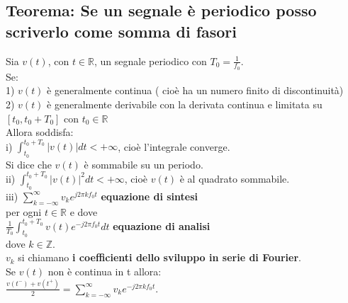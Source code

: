 	\subsection{Teorema: Se un segnale è periodico posso scriverlo come somma di fasori}
	Sia $ v(t) $, con $t \in \mathbb{R} $, un segnale periodico con $T_0=\frac{1}{f_0} $.\\
	Se:\\
	1) $ v(t) $ è generalmente continua ( cioè ha un numero finito di discontinuità)\\
	2) $ v(t) $ è generalmente derivabile con la derivata continua e limitata su $ [t_0,t_0+T_0] $ con $ t_0 \in \mathbb{R}$\\
	Allora soddisfa:\\
	i) $ \int_{t_0}^{ t_0+T_0} |v(t)| dt < +\infty $, cioè l'integrale converge.\\
	Si dice che $ v(t) $ è sommabile su un periodo.\\
	ii) $ \int_{t_0}^{ t_0+T_0} |v(t)|^2 dt < +\infty $, cioè $ v(t) $ è al quadrato sommabile.\\
	iii) $ \sum_{k= -\infty}^{\infty} v_k e^{j 2 \pi k f_0 t} $ \textbf{ equazione di sintesi}\\
	per ogni $t \in \mathbb{R} $ e dove\\
	$ \frac{1}{T_0}\int_{t_0}^{ t_0+T_0} v(t) e^{-j 2 \pi f_0 t} dt $ \textbf{ equazione di analisi}\\
	dove $ k \in \mathbb{Z}$.\\
	$ v_k $ si chiamano \textbf{ i coefficienti dello sviluppo in serie di Fourier}.\\
	Se $ v(t) $ non è continua in t allora:\\
	$ \frac{v(t^-)+v(t^+)}{2}= \sum_{k= -\infty}^{\infty} v_k e^{- j 2 \pi k f_0 t} $.\\
	
